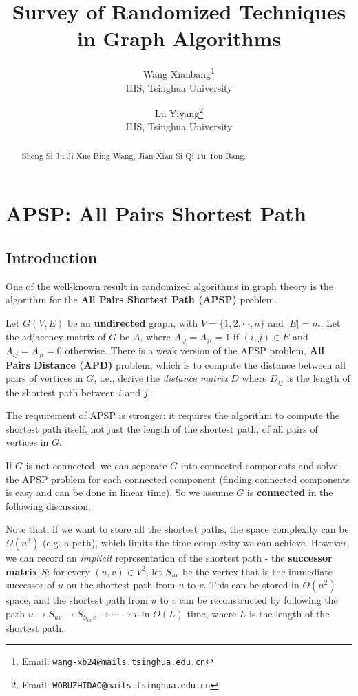 \documentclass[12pt]{article}
\title{Survey of Randomized Techniques in Graph Algorithms}
\author{
    Wang Xianbang\thanks{Email: \texttt{wang-xb24@mails.tsinghua.edu.cn}} \\
    IIIS, Tsinghua University
    \and
    Lu Yiyang\thanks{Email: \texttt{WOBUZHIDAO@mails.tsinghua.edu.cn}} \\
    IIIS, Tsinghua University
}
\begin{document}
\maketitle

\begin{abstract}
    Sheng Si Ju Ji Xue Bing Wang, Jian Xian Si Qi Fu Tou Bang.
\end{abstract}

\section{APSP: All Pairs Shortest Path}
\subsection{Introduction}

One of the well-known result in randomized algorithms in graph theory is the algorithm for the \textbf{All Pairs Shortest Path (APSP)} problem.

Let $G(V,E)$ be an \textbf{undirected} graph, with $V=\{1,2,\cdots,n\}$ and $|E|=m$. Let the adjacency matrix of $G$ be $A$, where $A_{ij}=A_{ji}=1$ if $(i,j)\in E$ and $A_{ij}=A_{ji}=0$ otherwise. There is a weak version of the APSP problem, \textbf{All Pairs Distance (APD)} problem, which is to compute the distance between all pairs of vertices in $G$, i.e., derive the \emph{distance matrix} $D$ where $D_{ij}$ is the length of the shortest path between $i$ and $j$.

The requirement of APSP is stronger: it requires the algorithm to compute the shortest path itself, not just the length of the shortest path, of all pairs of vertices in $G$. 

If $G$ is not connected, we can seperate $G$ into connected components and solve the APSP problem for each connected component (finding connected components is easy and can be done in linear time). So we assume $G$ is \textbf{connected} in the following discussion.

Note that, if we want to store all the shortest paths, the space complexity can be $\Omega(n^3)$ (e.g. a path), which limits the time complexity we can achieve. However, we can record an \emph{implicit} representation of the shortest path - the \textbf{successor matrix} $S$: for every $(u,v)\in V^2$, let $S_{uv}$ be the vertex that is the immediate successor of $u$ on the shortest path from $u$ to $v$. This can be stored in $O(n^2)$ space, and the shortest path from $u$ to $v$ can be reconstructed by following the path $u\to S_{uv}\to S_{S_{uv}v}\to\cdots\to v$ in $O(L)$ time, where $L$ is the length of the shortest path.
\end{document}
